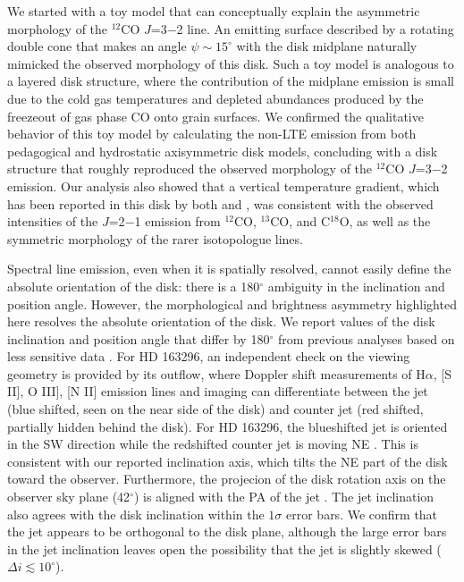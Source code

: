 We started with a toy model that can conceptually explain the asymmetric 
morphology of the $^{12}$CO $J$=3$-$2 line.  An emitting surface described by a 
rotating double cone that makes an angle $\psi \sim 15^\circ$ with the disk 
midplane naturally mimicked the observed morphology of this disk.  Such a toy 
model is analogous to a layered disk structure, where the contribution of the 
midplane emission is small due to the cold gas temperatures and depleted 
abundances produced by the freezeout of gas phase CO onto grain surfaces.  We 
confirmed the qualitative behavior of this toy model by calculating the non-LTE 
emission from both pedagogical and hydrostatic axisymmetric disk models, 
concluding with a disk structure that roughly reproduced the observed morphology
of the $^{12}$CO $J$=3$-$2 emission.  Our analysis also showed that a vertical 
temperature gradient, which has been reported in this disk by both 
\citet{qi11} and \citet{akiyama11}, was consistent with the observed 
intensities of the $J$=2$-$1 emission from $^{12}$CO, $^{13}$CO, and C$^{18}$O, 
as well as the symmetric morphology of the rarer isotopologue lines.

Spectral line emission, even when it is spatially resolved, cannot easily define
the absolute orientation of the disk: there is a 180$^\circ$ ambiguity in the 
inclination and position angle.  However, the morphological and brightness 
asymmetry highlighted here resolves the absolute orientation of the disk.  We 
report values of the disk inclination and position angle that differ by 
180$^\circ$ from previous analyses based on less sensitive data 
\citep{isella07,hughes08,qi11}.  For HD 163296, an independent check on the 
viewing geometry is provided by its outflow, where Doppler shift measurements 
of H$\alpha$, [S II], O III], [N II] emission lines and imaging can 
differentiate between the jet (blue shifted, seen on the near side of the disk) 
and counter jet (red shifted, partially hidden behind the disk).  
For HD 163296, the blueshifted jet is oriented in the SW direction while the 
redshifted counter jet is moving NE \citep[in agreement with the disk wind 
observed via $^{12}$CO by][]{klaassen13}.  This is consistent with our reported 
inclination axis, which tilts the NE part of the disk toward the observer.  
Furthermore, the projecion of the disk rotation axis on the observer sky plane 
(42$^\circ$) is aligned with the PA of the jet \citep[measured for the 
counter jet as $42.0 \pm 3.5^\circ$;][]{grady00}.  The 
jet inclination \citep[$51_{-9}^{+11}$$^\circ$;][]{wassell06,gunther13} also 
agrees with the disk inclination within the $1\sigma$ error bars.  We confirm 
that the jet appears to be orthogonal to the disk plane, although the 
large error bars in the jet inclination leaves open the possibility that the
jet is slightly skewed ($\Delta i \lesssim 10^\circ$).

